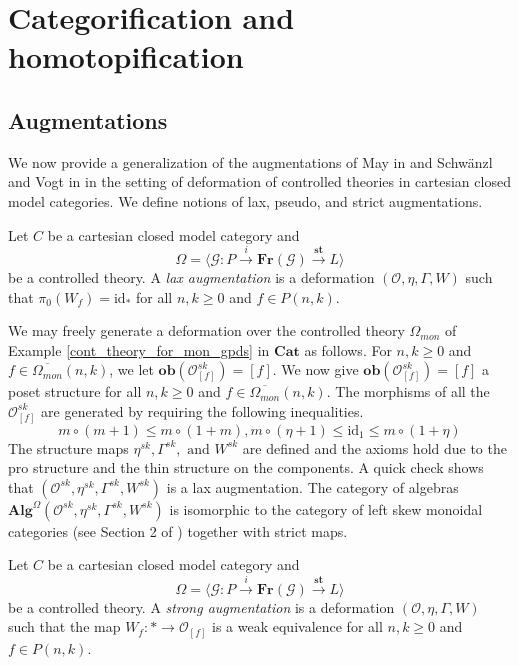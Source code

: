 \documentclass{tac}
\begin{document}
\section{Categorification and homotopification}
\subsection*{Augmentations} We now provide a generalization of the augmentations of May in \cite{May2} and Schw\"anzl and Vogt in \cite{SchwanzlVogt1989} in the setting of deformation of controlled theories in cartesian closed model categories. We define notions of lax, pseudo, and strict augmentations.
\begin{definition}
Let $C$ be a cartesian closed model category and 
\[
\Omega=\langle \mathcal{G}:P\xrightarrow{i}\mathbf{Fr}(\mathcal{G})\xrightarrow{\mathbf{st}}L\rangle
\]
be a controlled theory. A \emph{lax augmentation}  is a deformation $(\mathcal{O},\eta,\Gamma,W)$ such that $\pi_0(W_f)=\text{id}_*$ for all $n,k\geq 0$ and $f\in P(n,k)$.
\end{definition}

\begin{example}
We may freely generate a deformation over the controlled theory $\Omega_{mon}$ of Example \ref{cont_theory_for_mon_gpds} in $\mathbf{Cat}$ as follows. For $n,k\geq 0$ and $f\in\overline{\Omega_{mon}}(n,k)$, we let $\mathbf{ob}(\mathcal{O}^{sk}_{[f]})=[f]$. We now give $\mathbf{ob}(\mathcal{O}^{sk}_{[f]})=[f]$ a poset structure for all $n,k\geq 0$ and $f\in\overline{\Omega_{mon}}(n,k)$. The morphisms of all the $\mathcal{O}^{sk}_{[f]}$ are generated by requiring the following inequalities.
\[
m\circ (m+1)\leq m\circ (1+m), m\circ (\eta+1)\leq \text{id}_1\leq m\circ (1+\eta)
\]
The structure maps $\eta^{sk},\Gamma^{sk},\text{ and } W^{sk}$ are defined and the axioms hold due to the pro structure and the thin structure on the components. A quick check shows that $(\mathcal{O}^{sk},\eta^{sk},\Gamma^{sk},W^{sk})$ is a lax augmentation.
 The category of algebras $\mathbf{Alg}^\Omega(\mathcal{O}^{sk},\eta^{sk},\Gamma^{sk},W^{sk})$ is isomorphic to the category of left skew monoidal categories (see Section 2 of \cite{Uus}) together with strict maps.
\end{example}

\begin{definition}
Let $C$ be a cartesian closed model category and 
\[
\Omega=\langle \mathcal{G}:P\xrightarrow{i}\mathbf{Fr}(\mathcal{G})\xrightarrow{\mathbf{st}}L\rangle
\]
be a controlled theory. A \emph{strong augmentation} is a deformation $(\mathcal{O},\eta,\Gamma,W)$ such that the map $W_f:*\to \mathcal{O}_{[f]}$ is a weak equivalence for all $n,k\geq 0$ and $f\in P(n,k)$.
\end{definition}
 
\end{document}

